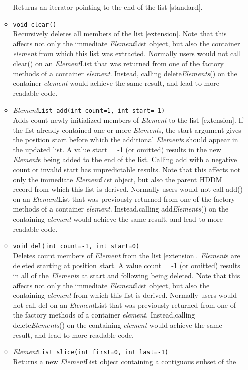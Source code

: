\documentclass{revtex4}
\begin{document}
\begin{itemize}
\begin{itemize}
Returns an iterator pointing to the end of the list [standard].
\item \texttt{void clear()}\\
Recursively deletes all members of the list [extension]. Note that this
affects not only the immediate {\em Element}List object, but also the container
{\em element} from which this list was extracted. Normally users would not call
clear() on an {\em Element}List that was returned from one of the factory
methods of a container {\em element}. Instead, calling delete{\em Elements}()
on the container {\em element} would achieve the same result, and lead to more
readable code.
\item {\em Element}\texttt{List add(int count=1, int start=-1)}\\
Adds count newly initialized members of {\em Element} to the list [extension]. If
the list already contained one or more {\em Element}s, the start argument gives the
position start before which the additional {\em Element}s should appear in the
updated list. A value start = -1 (or omitted) results in the new {\em Element}s
being added to the end of the list. Calling add with a negative count or
invalid start has unpredictable results. Note that this affects not only the
immediate {\em Element}List object, but also the parent HDDM record from which this
list is derived. Normally users would not call add() on an {\em Element}List that
was previously returned from one of the factory methods of a container
{\em element}. Instead,calling add{\em Elements}() on the containing {\em element}
would achieve the same result, and lead to more readable code.
\item \texttt{void del(int count=-1, int start=0)}\\
Deletes count members of {\em Element} from the list [extension]. {\em Element}s are
deleted starting at position start. A value count = -1 (or omitted) results in
all of the {\em Element}s at start and following being deleted. Note that this
affects not only the immediate {\em Element}List object, but also the containing
{\em element} from which this list is derived.
Normally users would not call del on an {\em Element}List that was previously
returned from one of the factory methods of a container {\em element}.
Instead,calling delete{\em Elements}() on the containing {\em element} would
achieve the same result, and lead to more readable code.
\item {\em Element}\texttt{List slice(int first=0, int last=-1)}\\
Returns a new {\em Element}List object containing a contiguous subset of the

\end{itemize}
\end{itemize}
\end{document}
